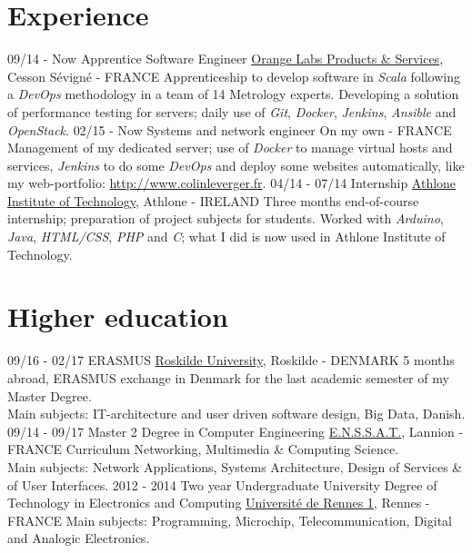 \documentclass[]{friggeri-cv}
\begin{document}
\section{Experience}
\begin{entrylist}
  \entry
    {09/14 - Now}
    {Apprentice Software Engineer}
    {\href{http://www.orange.com/en/home}{Orange Labs Products \& Services}, Cesson S\'evign\'e - FRANCE}
    {Apprenticeship to develop software in \emph{Scala} following a \emph{DevOps} methodology in a team of 14 Metrology experts. Developing a solution of performance testing for servers; daily use of \emph{Git}, \emph{Docker}, \emph{Jenkins}, \emph{Ansible} and \emph{OpenStack}.}
  \entry
    {02/15 - Now}
    {Systems and network engineer}
    {On my own - FRANCE}
    {Management of my dedicated server; use of \emph{Docker} to manage virtual hosts and services, \emph{Jenkins} to do some \emph{DevOps} and deploy some websites automatically, like my web-portfolio: \href{http://www.colinleverger.fr}{http://www.colinleverger.fr}.}
  \entry
    {04/14 - 07/14}
    {Internship}
    {\href{http://www.ait.ie/}{Athlone Institute of Technology}, Athlone - IRELAND}
    {Three months end-of-course internship; preparation of project subjects for students. Worked with \emph{Arduino}, \emph{Java}, \emph{HTML/CSS}, \emph{PHP} and \emph{C}; what I did is now used in Athlone Institute of Technology.}
\end{entrylist}

\section{Higher education}
\begin{entrylist}
  \entry
    {09/16 - 02/17}
    {ERASMUS}
    {\href{http://www.ruc.dk/en/}{Roskilde University}, Roskilde - DENMARK}
    {5 months abroad, ERASMUS exchange in Denmark for the last academic semester of my Master Degree.\\ 
    Main subjects: IT-architecture and user driven software design, Big Data, Danish.}
  \entry
    {09/14 - 09/17}
    {Master 2 Degree in Computer Engineering}
    {\href{http://www.enssat.fr}{E.N.S.S.A.T.}, Lannion - FRANCE}
    {Curriculum Networking, Multimedia \& Computing Science.\\
    Main subjects: Network Applications, Systems Architecture, Design of Services \& of User Interfaces.}
  \entry
    {2012 - 2014}
    {Two year Undergraduate University Degree of Technology in Electronics and Computing}
    {\href{https://iut-rennes.univ-rennes1.fr/les-6-departements/genie-electrique-informatique-industrielle}{Universit\'e de Rennes 1}, Rennes - FRANCE}
    {Main subjects: Programming, Microchip, Telecommunication, Digital and Analogic Electronics.}
\end{entrylist}
\end{document}
